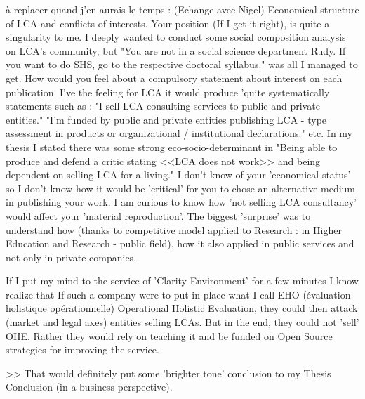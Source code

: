 %


à replacer quand j'en aurais le temps : (Echange avec Nigel)
Economical structure of LCA and conflicts of interests.
Your position (If I get it right), is quite a singularity to me. I deeply wanted to conduct some social composition analysis on LCA's community, but "You are not in a social science department Rudy. If you want to do SHS, go to the respective doctoral syllabus." was all I managed to get.
How would you feel about a compulsory statement about interest on each publication. I've the feeling for LCA it would produce 'quite systematically statements such as :
"I sell LCA consulting services to public and private entities."
"I'm funded by public and private entities publishing LCA - type assessment in products or organizational / institutional declarations."
etc.
In my thesis I stated there was some strong eco-socio-determinant in "Being able to produce and defend a critic stating <<LCA does not work>> and being dependent on selling LCA for a living."
I don't know of your 'economical status' so I don't know how it would be 'critical' for you to chose an alternative medium in publishing your work. I am curious to know how 'not selling LCA consultancy' would affect your 'material reproduction'.
The biggest 'surprise' was to understand how (thanks to competitive model applied to Research : in Higher Education and Research - public field), how it also applied in public services and not only in private companies.

If I put my mind to the service of 'Clarity Environment' for a few minutes I know realize that If such a company were to put in place what I call EHO (évaluation holistique opérationnelle) Operational Holistic Evaluation, they could then attack (market and legal axes) entities selling LCAs. But in the end, they could not 'sell' OHE. Rather they would rely on teaching it and be funded on Open Source strategies for improving the service.

>> That would definitely put some 'brighter tone' conclusion to my Thesis Conclusion (in a business perspective).
